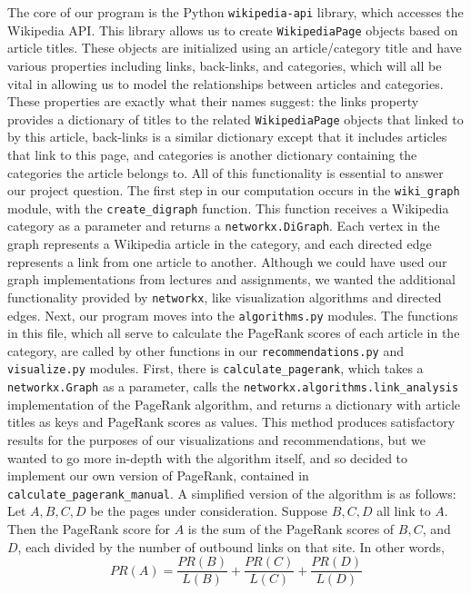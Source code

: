 \documentclass[fontsize=11pt]{article}
\begin{document}
The core of our program is the Python \texttt{wikipedia-api} library, which accesses the Wikipedia API. This library allows us to create \texttt{WikipediaPage} objects based on article titles. These objects are initialized using an article/category title and have various
properties including links, back-links, and categories, which will all be vital in allowing us to model the
relationships between articles and categories. These properties are exactly what their names suggest: the links
property provides a dictionary of titles to the related \texttt{WikipediaPage} objects that linked to by this article, back-links
is a similar dictionary except that it includes articles that link to this page, and categories is another dictionary
containing the categories the article belongs to. All of this functionality is essential to answer our project question.
The first step in our computation occurs in the \texttt{wiki\_graph} module, with the \texttt{create\_digraph} function. This function receives a Wikipedia category as a parameter and returns a \texttt{networkx.DiGraph}. Each vertex in the graph represents a Wikipedia article in the category, and each directed edge represents a link from one article to another. Although we could have used our graph implementations from lectures and assignments, we wanted the additional functionality provided by \texttt{networkx}, like visualization algorithms and directed edges.
Next, our program moves into the \texttt{algorithms.py} modules. The functions in this file, which all serve to calculate the PageRank scores of each article in the category, are called by other functions in our \texttt{recommendations.py} and \texttt{visualize.py} modules. 
First, there is \texttt{calculate\_pagerank}, which takes a \texttt{networkx.Graph} as a parameter, calls the \texttt{networkx.algorithms.link\_analysis} implementation of the PageRank algorithm, and returns a dictionary with article titles as keys and PageRank scores as values. This method produces satisfactory results for the purposes of our visualizations and recommendations, but we wanted to go more in-depth with the algorithm itself, and so decided to implement our own version of PageRank, contained in \texttt{calculate\_pagerank\_manual}.
A simplified version of the algorithm is as follows: Let \(A, B, C, D\) be the pages under consideration. Suppose \(B, C, D\) all link to \(A\). Then the PageRank score for \(A\) is the sum of the PageRank scores of \(B, C\), and \(D\), each divided by the number of outbound links on that site. In other words,
$$PR(A) = \frac{PR(B)}{L(B)} + \frac{PR(C)}{L(C)} + \frac{PR(D)}{L(D)}$$
\end{document}

